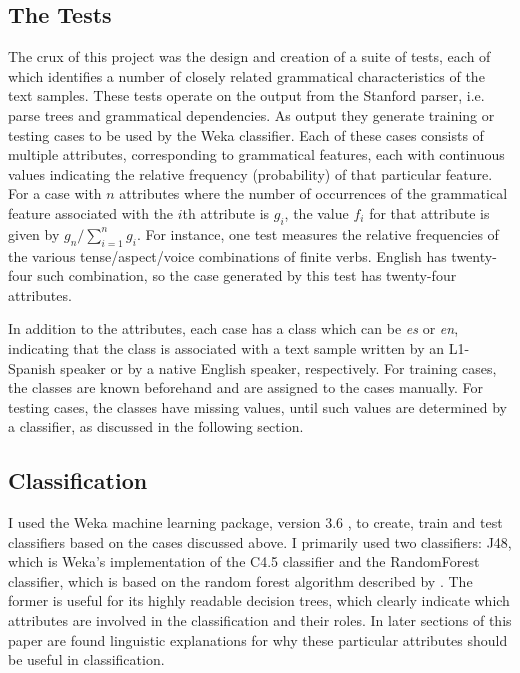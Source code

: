 \documentclass[main.tex]{subfiles}
\begin{document}
\subsection{The Tests}
The crux of this project was the design and creation of a suite of tests, each of which identifies a number of closely related grammatical characteristics of the text samples. These tests operate on the output from the Stanford parser, i.e. parse trees and grammatical dependencies. As output they generate training or testing cases to be used by the Weka classifier. Each of these cases consists of multiple attributes, corresponding to grammatical features, each with continuous values indicating the relative frequency (probability) of that particular feature. For a case with $n$ attributes where the number of occurrences of the grammatical feature associated with the $i$th attribute is $g_i$, the value $f_i$ for that attribute is given by $g_n  / \displaystyle\sum\limits_{i=1}^n g_i$. For instance, one test measures the relative frequencies of the various tense/aspect/voice combinations of finite verbs. English has twenty-four such combination, so the case generated by this test has twenty-four attributes.

In addition to the attributes, each case has a class which can be \textit{es} or \textit{en}, indicating that the class is associated with a text sample written by an L1-Spanish speaker or by a native English speaker, respectively. For training cases, the classes are known beforehand and are assigned to the cases manually. For testing cases, the classes have missing values, until such values are determined by a classifier, as discussed in the following section.

\subsection{Classification}

I used the Weka machine learning package, version 3.6 \citep{hall-et-al:2009}, to create, train and test classifiers based on the cases discussed above. I primarily used two classifiers: J48, which is Weka's implementation of the C4.5 classifier \citep*{quinlan:1993} and the RandomForest classifier, which is based on the random forest algorithm described by \citet{breiman:2001}. The former is useful for its highly readable decision trees, which clearly indicate which attributes are involved in the classification and their roles. In later sections of this paper are found linguistic explanations for why these particular attributes should be useful in classification.
 
\end{document}
